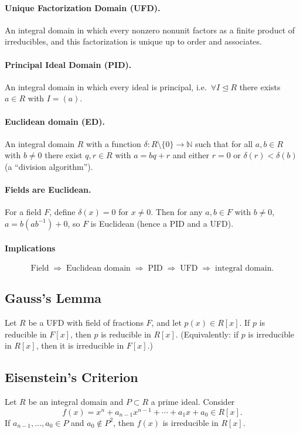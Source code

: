 \documentclass[12pt]{article}
\begin{document}
\paragraph{Unique Factorization Domain (UFD).}
An integral domain in which every nonzero nonunit factors as a finite product of
irreducibles, and this factorization is unique up to order and associates.

\paragraph{Principal Ideal Domain (PID).}
An integral domain in which every ideal is principal, i.e.\ $\forall I\unlhd R$ there exists $a\in R$
with $I=(a)$.

\paragraph{Euclidean domain (ED).}
An integral domain $R$ with a function $\delta:R\setminus\{0\}\to\mathbb N$ such that for all
$a,b\in R$ with $b\neq 0$ there exist $q,r\in R$ with $a=bq+r$ and either $r=0$ or
$\delta(r)<\delta(b)$ (a “division algorithm”).

\paragraph{Fields are Euclidean.}
For a field $F$, define $\delta(x)=0$ for $x\neq 0$. Then for any $a,b\in F$ with $b\neq 0$,
$a=b(ab^{-1})+0$, so $F$ is Euclidean (hence a PID and a UFD).

\paragraph{Implications}
\[
\text{Field} \;\Rightarrow\; \text{Euclidean domain} \;\Rightarrow\; \text{PID} \;\Rightarrow\; \text{UFD} \;\Rightarrow\; \text{integral domain}.
\]

\subsection{Gauss's Lemma}
Let $R$ be a UFD with field of fractions $F$, and let $p(x)\in R[x]$. 
If $p$ is reducible in $F[x]$, then $p$ is reducible in $R[x]$.
(Equivalently: if $p$ is irreducible in $R[x]$, then it is irreducible in $F[x]$.)

\subsection{Eisenstein's Criterion}
Let $R$ be an integral domain and $P\subset R$ a prime ideal. Consider
\[
f(x)=x^n+a_{n-1}x^{n-1}+\cdots+a_1x+a_0\in R[x].
\]
If $a_{n-1},\dots,a_0\in P$ and $a_0\notin P^2$, then $f(x)$ is irreducible in $R[x]$.
\end{document}
